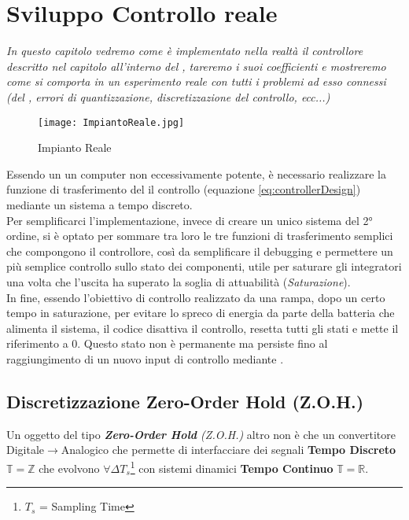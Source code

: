 \chapter{Sviluppo Controllo reale}\label{cap:controlDevelop}

\begin{minipage}{12cm}\textit{
		In questo capitolo vedremo come è implementato nella realtà il controllore descritto nel capitolo  all'interno del \microControllore, tareremo i suoi coefficienti e mostreremo come si comporta in un esperimento reale con tutti i problemi ad esso connessi (\nonLinearita del \cite*{IBT-2}, errori di quantizzazione, discretizzazione del controllo, ecc...)
	}
\end{minipage}


\begin{figure}[H]
	\centering
	\caption[Impianto Reale]{Impianto Reale}
	\texttt{[image: ImpiantoReale.jpg]}
\end{figure}
\noindent
Essendo un \microControllore un computer non eccessivamente potente, è necessario realizzare la funzione di trasferimento del il controllo (equazione \ref{eq:controllerDesign}) mediante un sistema a tempo discreto.\\
Per semplificarci l'implementazione, invece di creare un unico sistema del 2° ordine, si è optato per sommare tra loro le tre funzioni di trasferimento semplici che compongono il controllore, così da semplificare il debugging e permettere un più semplice controllo sullo stato dei componenti, utile per saturare gli integratori una volta che l'uscita ha superato la soglia di attuabilità (\textit{Saturazione}).\\
In fine, essendo l'obiettivo di controllo realizzato da una rampa, dopo un certo tempo in saturazione, per evitare lo spreco di energia da parte della batteria che alimenta il sistema, il codice disattiva il controllo, resetta tutti gli stati e mette il riferimento a 0. Questo stato non è permanente ma persiste fino al raggiungimento di un nuovo input di controllo mediante \cite*{EMP}.

\newpage
\section{Discretizzazione Zero-Order Hold (Z.O.H.)}
Un oggetto del tipo \textit{\textbf{Zero-Order Hold} (Z.O.H.)} altro non è che un convertitore Digitale$ \rightarrow $Analogico che permette di interfacciare dei segnali \textbf{Tempo Discreto} $\mathbb{T} =  \mathbb{Z} $ che evolvono $\forall \Delta T_s $\footnote{$ T_s $ = Sampling Time} con sistemi dinamici \textbf{Tempo Continuo} $\mathbb{T} =  \mathbb{R} $.

